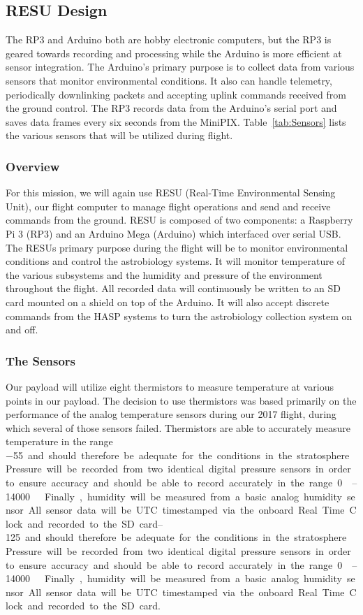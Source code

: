 \subsection{RESU Design}
\label{sec:RESU-Design}

   The RP3 and Arduino both are hobby electronic computers, but the RP3 is geared towards recording and processing while the Arduino is more efficient at sensor integration.  The Arduino's primary purpose is to collect data from various sensors that monitor environmental conditions. It also can handle telemetry, periodically downlinking packets and accepting uplink commands received from the ground control. The RP3 records data from the Arduino's serial port and saves data frames every six seconds from the MiniPIX.  Table~\ref{tab:Sensors} lists the various sensors that will be utilized during flight.

\subsubsection{Overview}

For this mission, we will again use RESU (Real-Time Environmental Sensing Unit), our flight computer to manage flight operations and send and receive commands from the ground. RESU is composed of two components: a Raspberry Pi 3 (RP3) and an Arduino Mega (Arduino) which interfaced over serial USB. The RESUs primary purpose during the flight will be to monitor environmental conditions and control the astrobiology systems. It will monitor temperature of the various subsystems and the humidity and pressure of the environment throughout the flight. All recorded data will continuously be written to an SD card mounted on a shield on top of the Arduino. It will also accept discrete commands from the HASP systems to turn the astrobiology collection system on and off.

\subsubsection{The Sensors}

Our payload will utilize eight thermistors to measure temperature at various points in our payload. The decision to use thermistors was based primarily on the performance of the analog temperature sensors during our 2017 flight, during which several of those sensors failed. Thermistors are able to accurately measure temperature in the range \SIrange{-55}{125} and should therefore be adequate for the conditions in the stratosphere. Pressure will be recorded from two identical digital pressure sensors in order to ensure accuracy and should be able to record accurately in the range \SIrange{0}{14000}{\milli\bara}. Finally, humidity will be measured from a basic analog humidity sensor. All sensor data will be UTC timestamped via the onboard Real Time Clock and recorded to the SD card.

